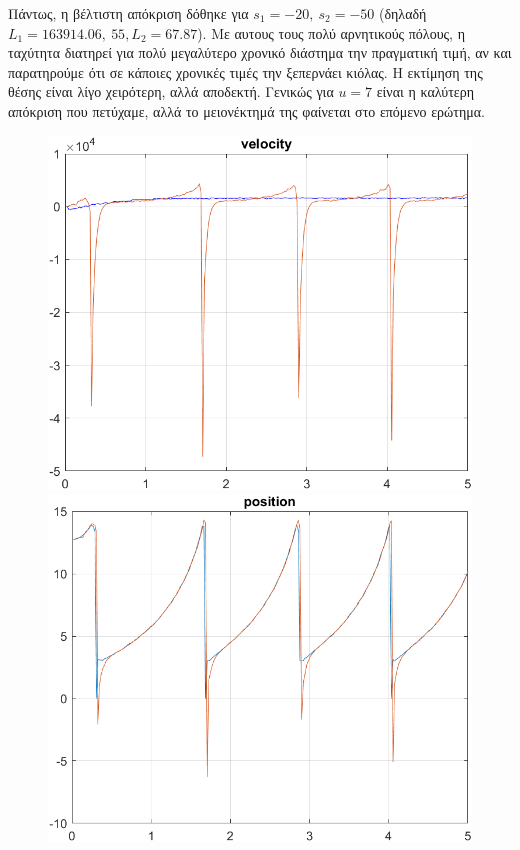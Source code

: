 Πάντως, η βέλτιστη απόκριση δόθηκε για $s_1 = -20,\ s_2 = -50$  (δηλαδή $L_1 = 163914.06,\ 55, L_2 = 67.87$). Με αυτους τους πολύ αρνητικούς πόλους, η ταχύτητα διατηρεί για πολύ μεγαλύτερο χρονικό διάστημα την πραγματική τιμή, αν και παρατηρούμε ότι σε κάποιες χρονικές τιμές την ξεπερνάει κιόλας. Η εκτίμηση της θέσης είναι λίγο χειρότερη, αλλά αποδεκτή. Γενικώς για $u=7$ είναι η καλύτερη απόκριση που πετύχαμε, αλλά το μειονέκτημά της φαίνεται στο επόμενο ερώτημα.
\begin{figure}[H]
    \centering
    \begin{minipage}{0.45\textwidth}
        \includegraphics[width=\linewidth]{Images/lab4/1/veltisto/vel4.1.png}
    \end{minipage}
    \hfill
    \begin{minipage}{0.45\textwidth}
        \includegraphics[width=\linewidth]{Images/lab4/1/veltisto/pos4.1.png}
    \end{minipage}
\end{figure}
